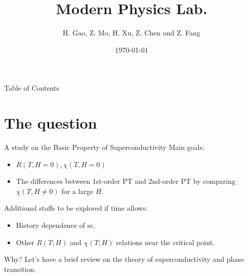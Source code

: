 \documentclass[aspectratio=1610,14pt]{beamer}
\title{Modern Physics Lab.}
\author{H. Gao, Z. Mo, H. Xu, Z. Chen and Z. Fang}
\date{\today}
\begin{document}
\begin{frame}
 
\maketitle
\end{frame}
\begin{frame}{Table of Contents}
\tableofcontents
\end{frame}




\section{The question}
\begin{frame}{A study on the Basic Property of Superconductivity}
Main goals:
\begin{itemize}
\item
$R(T,H=0),\chi(T,H=0)$
\item
The differences between 1st-order PT and 2nd-order PT by comparing $\chi(T,H\not=0)$ for a large $H$.
\end{itemize}
Additional staffs to be explored if time allows:
\begin{itemize}
\item
History dependence of sc.
\item
Other $R(T;H)$ and $\chi(T;H)$ relations near the critical point.
\end{itemize}
\end{frame}

\begin{frame}{Why?}
Let's have a brief review on the theory of superconductivity and phase transition.
\end{frame}
\end{document}
